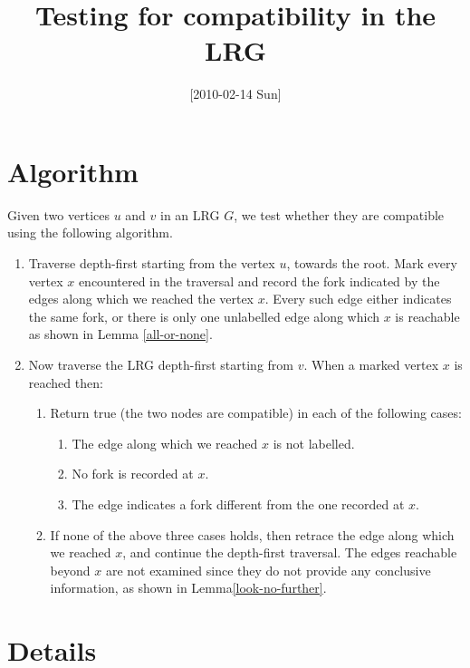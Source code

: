 \documentclass[12pt,a4paper]{article}
\title{Testing for compatibility in the LRG}
\date{[2010-02-14 Sun]}
\begin{document}
\maketitle


\section{Algorithm}
\label{sec-1}


Given two vertices $u$ and $v$ in an LRG $G$, we test whether they are
compatible using the following algorithm.

\begin{enumerate}
\item Traverse depth-first starting from the vertex $u$, towards the
    root. Mark every vertex $x$ encountered in the traversal and
    record the fork indicated by the edges along which we reached the
    vertex $x$. Every such edge either indicates the same fork, or
    there is only one unlabelled edge along which $x$ is reachable as
    shown in Lemma \ref{all-or-none}.
\item Now traverse the LRG depth-first starting from $v$. When a marked
    vertex $x$ is reached then:

\begin{enumerate}
\item Return true (the two nodes are compatible) in each of the
       following cases:

\begin{enumerate}
\item The edge along which we reached $x$ is not labelled.
\item No fork is recorded at $x$.
\item The edge indicates a fork different from the one recorded at
       $x$.
\end{enumerate}

\item If none of the above three cases holds, then retrace the edge
       along which we reached $x$, and continue the depth-first
       traversal. The edges reachable beyond $x$ are not examined
       since they do not provide any conclusive information, as shown
       in Lemma\ref{look-no-further}.
\end{enumerate}

\end{enumerate}
\section{Details}
\label{sec-2}
\end{document}
